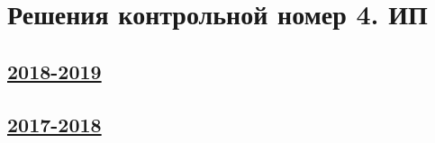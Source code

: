 \thispagestyle{empty}
\section{Решения контрольной номер 4. ИП}




\subsection[2018-2019]{\hyperref[sec:kr_04_ip_2018_2019]{2018-2019}}
\label{sec:sol_kr_04_ip_2018_2019}


\subsection[2017-2018]{\hyperref[sec:kr_04_ip_2017_2018]{2017-2018}}
\label{sec:sol_kr_04_ip_2017_2018}